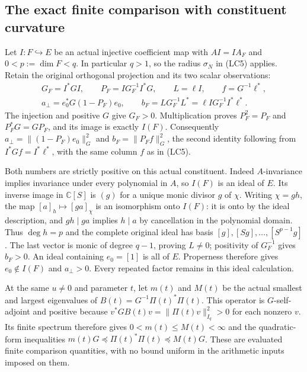 \documentclass{article}
\begin{document}
\subsection{The exact finite comparison with constituent curvature}

Let $I:F\hookrightarrow E$ be an actual injective coefficient map
with $AI=IA_F$ and $0<p:=\dim F<q$. In particular $q>1$, so
the radius $\sigma_N$ in (LC5) applies. Retain the original
orthogonal projection and its two scalar observations:
\[
\begin{gathered}
 G_F=I^*GI,\qquad P_F=I G_F^{-1}I^*G,\qquad L=\ell I,\qquad
 f=G^{-1}\ell^*,\\
 a_\perp=e_0^*G(1-P_F)e_0,\qquad
 b_F=L G_F^{-1}L^*=\ell I G_F^{-1}I^*\ell^*.
\end{gathered}\tag{LC13}
\]
The injection and positive $G$ give $G_F>0$. Multiplication proves
$P_F^2=P_F$ and $P_F^*G=GP_F$, and its image is exactly $I(F)$.
Consequently $a_\perp=\|(1-P_F)e_0\|_G^2$ and
$b_F=\|P_Ff\|_G^2$, the second identity following from
$I^*Gf=I^*\ell^*$, with the same column $f$ as in (LC5).

Both numbers are strictly positive on this actual constituent.
Indeed $A$-invariance implies invariance under every polynomial in
$A$, so $I(F)$ is an ideal of $E$. Its inverse image in
$\mathbb C[S]$ is $(g)$ for a unique monic divisor $g$ of $\chi$.
Writing $\chi=gh$, the map $[a]_h\mapsto[ga]_\chi$ is an
isomorphism onto $I(F)$: it is onto by the ideal description, and
$gh\mid ga$ implies $h\mid a$ by cancellation in the polynomial
domain. Thus $\deg h=p$ and the complete original ideal has basis
$[g],[Sg],\ldots,[S^{p-1}g]$. The last vector is monic of degree
$q-1$, proving $L\ne0$; positivity of $G_F^{-1}$ gives $b_F>0$.
An ideal containing $e_0=[1]$ is all of $E$. Properness therefore
gives $e_0\notin I(F)$ and $a_\perp>0$. Every repeated factor
remains in this ideal calculation.

At the same $u\ne0$ and parameter $t$, let $m(t)$ and $M(t)$ be
the actual smallest and largest eigenvalues of
$B(t)=G^{-1}\Pi(t)^*\Pi(t)$. This operator is $G$-self-adjoint
and positive because $v^*GB(t)v=\|\Pi(t)v\|_{I_q}^2>0$ for
each nonzero $v$. Its finite spectrum therefore gives
$0<m(t)\le M(t)<\infty$ and the quadratic-form inequalities
$m(t)G\preceq\Pi(t)^*\Pi(t)\preceq M(t)G$.
These are evaluated finite comparison quantities, with no bound
uniform in the arithmetic inputs imposed on them.
\end{document}

